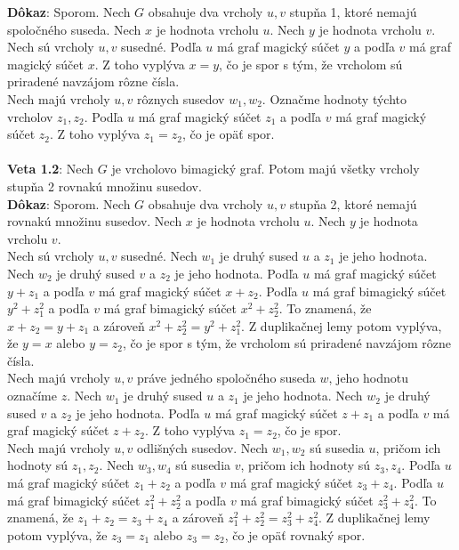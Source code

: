 \documentclass[12pt]{article}
\begin{document}
\textbf{Dôkaz}: Sporom. Nech $G$ obsahuje dva vrcholy $u,v$ stupňa 1, ktoré nemajú spoločného suseda. Nech $x$ je hodnota vrcholu $u$. Nech $y$ je hodnota vrcholu $v$. \\

Nech sú vrcholy $u,v$ susedné. Podľa $u$ má graf magický súčet $y$ a podľa $v$ má graf magický súčet $x$. Z toho vyplýva $x = y$, čo je spor s tým, že vrcholom sú priradené navzájom rôzne čísla. \\

Nech majú vrcholy $u,v$ rôznych susedov $w_1, w_2$. Označme hodnoty týchto vrcholov $z_1, z_2$. Podľa $u$ má graf magický súčet $z_1$ a podľa $v$ má graf magický súčet $z_2$. Z toho vyplýva $z_1 = z_2$, čo je opäť spor. \\\\

\textbf{Veta 1.2}: Nech $G$ je vrcholovo bimagický graf. Potom majú všetky vrcholy stupňa 2 rovnakú množinu susedov. \\

\textbf{Dôkaz}: Sporom. Nech $G$ obsahuje dva vrcholy $u,v$ stupňa 2, ktoré nemajú rovnakú množinu susedov. Nech $x$ je hodnota vrcholu $u$. Nech $y$ je hodnota vrcholu $v$. \\

Nech sú vrcholy $u,v$ susedné. Nech $w_1$ je druhý sused $u$ a $z_1$ je jeho hodnota. Nech $w_2$ je druhý sused $v$ a $z_2$ je jeho hodnota. Podľa $u$ má graf magický súčet $y + z_1$ a podľa $v$ má graf magický súčet $x + z_2$. Podľa $u$ má graf bimagický súčet $y^2 + z^2_1$ a podľa $v$ má graf bimagický súčet $x^2 + z^2_2$.  To znamená, že $x + z_2 = y + z_1$ a zároveň $x^2 + z^2_2 = y^2 + z^2_1$. Z duplikačnej lemy potom vyplýva, že $y = x$ alebo $y = z_2$, čo je spor s tým, že vrcholom sú priradené navzájom rôzne čísla. \\

Nech majú vrcholy $u,v$ práve jedného spoločného suseda $w$, jeho hodnotu označíme $z$. Nech $w_1$ je druhý sused $u$ a $z_1$ je jeho hodnota. Nech $w_2$ je druhý sused $v$ a $z_2$ je jeho hodnota. Podľa $u$ má graf magický súčet $z + z_1$ a podľa $v$ má graf magický súčet $z + z_2$. Z toho vyplýva $z_1 = z_2$, čo je spor. \\

Nech majú vrcholy $u,v$ odlišných susedov. Nech $w_1, w_2$ sú susedia $u$, pričom ich hodnoty sú $z_1, z_2$. Nech $w_3, w_4$ sú susedia $v$, pričom ich hodnoty sú $z_3, z_4$. Podľa $u$ má graf magický súčet $z_1 + z_2$ a podľa $v$ má graf magický súčet $z_3 + z_4$. Podľa $u$ má graf bimagický súčet $z^2_1 + z^2_2$ a podľa $v$ má graf bimagický súčet $z^2_3 + z^2_4$. To znamená, že $z_1 + z_2 = z_3 + z_4$ a zároveň $z^2_1 + z^2_2 = z^2_3 + z^2_4$. Z duplikačnej lemy potom vyplýva, že $z_3 = z_1$ alebo $z_3 = z_2$, čo je opäť rovnaký spor. \\\\
\end{document}
